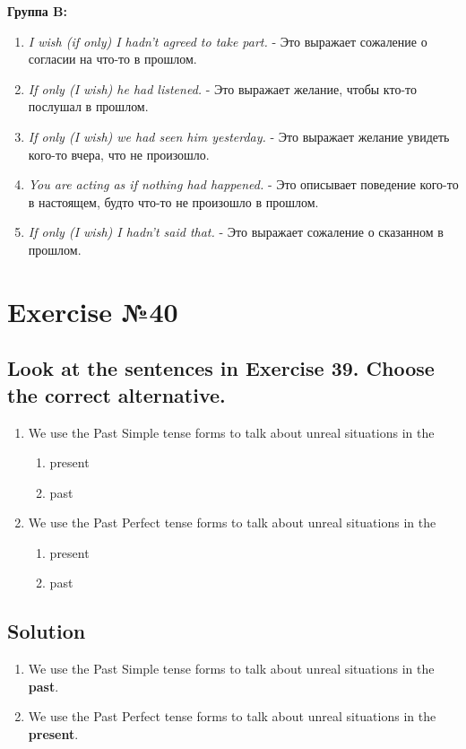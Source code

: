\textbf{Группа B:}
\begin{enumerate}
      \item \textit{I wish (if only) I hadn't agreed to take part.} - Это выражает сожаление о согласии на что-то в прошлом.
      \item \textit{If only (I wish) he had listened.} - Это выражает желание, чтобы кто-то послушал в прошлом.
      \item \textit{If only (I wish) we had seen him yesterday.} - Это выражает желание увидеть кого-то вчера, что не произошло.
      \item \textit{You are acting as if nothing had happened.} - Это описывает поведение кого-то в настоящем, будто что-то не произошло в прошлом.
      \item \textit{If only (I wish) I hadn’t said that.} - Это выражает сожаление о сказанном в прошлом.
\end{enumerate}

\section{Exercise №40}
\subsection*{Look at the sentences in Exercise 39. Choose the correct alternative.}
\begin{enumerate}
      \item We use the Past Simple tense forms to talk about unreal situations in the
            \begin{enumerate}
                  \item present
                  \item past
            \end{enumerate}
      \item We use the Past Perfect tense forms to talk about unreal situations in the
            \begin{enumerate}
                  \item present
                  \item past
            \end{enumerate}
\end{enumerate}

\subsection*{Solution}
\begin{enumerate}
      \item We use the Past Simple tense forms to talk about unreal situations in the \textbf{past}.
      \item We use the Past Perfect tense forms to talk about unreal situations in the \textbf{present}.
\end{enumerate}

